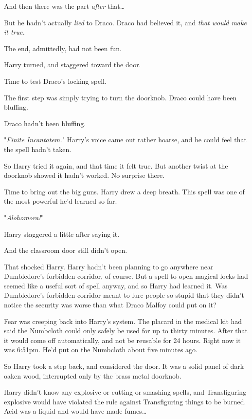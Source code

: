 And then there was the part \emph{after} that{\ldots}

But he hadn't actually \emph{lied} to Draco. Draco had believed it, and 
\emph{that would make it true.}

The end, admittedly, had not been fun.

Harry turned, and staggered toward the door.

Time to test Draco's locking spell.

The first step was simply trying to turn the doorknob. Draco could have been 
bluffing.

Draco hadn't been bluffing.

"\emph{Finite Incantatem.}" Harry's voice came out rather hoarse, and he could 
feel that the spell hadn't taken.

So Harry tried it again, and that time it felt true. But another twist at the 
doorknob showed it hadn't worked. No surprise there.

Time to bring out the big guns. Harry drew a deep breath. This spell was one of 
the most powerful he'd learned so far.

"\emph{Alohomora!}"

Harry staggered a little after saying it.

And the classroom door still didn't open.

That shocked Harry. Harry hadn't been planning to go anywhere near Dumbledore's 
forbidden corridor, of course. But a spell to open magical locks had seemed 
like a useful sort of spell anyway, and so Harry had learned it. Was 
Dumbledore's forbidden corridor meant to lure people so stupid that they didn't 
notice the security was worse than what Draco Malfoy could put on it?

Fear was creeping back into Harry's system. The placard in the medical kit had 
said the Numbcloth could only safely be used for up to thirty minutes. After 
that it would come off automatically, and not be reusable for 24 hours. Right 
now it was 6:51pm. He'd put on the Numbcloth about five minutes ago.

So Harry took a step back, and considered the door. It was a solid panel of 
dark oaken wood, interrupted only by the brass metal doorknob.

Harry didn't know any explosive or cutting or smashing spells, and 
Transfiguring explosive would have violated the rule against Transfiguring 
things to be burned. Acid was a liquid and would have made fumes{\ldots}

